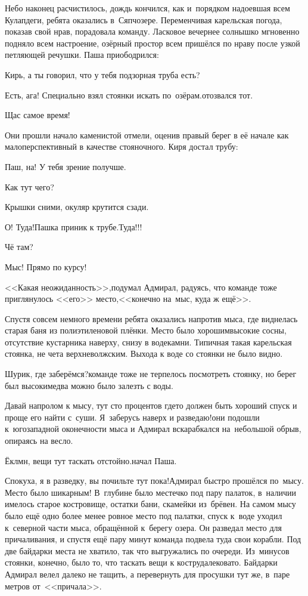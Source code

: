 Небо наконец расчистилось, дождь кончился, как и~порядком надоевшая всем Кулапдеги, ребята оказались в~Сяпчозере. Переменчивая карельская погода, показав свой нрав, порадовала команду. Ласковое вечернее солнышко мгновенно подняло всем настроение, озёрный простор всем пришёлся по нраву после узкой петляющей речушки. Паша приободрился:

\diagdash Кирь, а ты говорил, что у тебя подзорная труба есть?

\diagdash Есть, ага! Специально взял стоянки искать по~озёрам.\mdash отозвался тот.  

\diagdash Щас самое время!

Они прошли начало каменистой отмели, оценив правый берег в её начале как малоперспективный в качестве стояночного. Киря достал трубу:

\diagdash Паш, на! У тебя зрение получше.

\diagdash Как тут чего?

\diagdash Крышки сними, окуляр крутится сзади.

\diagdash О! Туда!\mdash Пашка приник к трубе.\mdash Туда!!!

\diagdash Чё там?

\diagdash Мыс! Прямо по курсу!

<<Какая неожиданность>>,\mdash подумал Адмирал, радуясь, что команде тоже приглянулось <<его>> место,\mdash <<конечно на~мыс, куда ж ещё>>.

Спустя совсем немного времени ребята оказались напротив мыса, где виднелась старая баня из полиэтиленовой плёнки. Место было хорошим\mdash высокие сосны, отсутствие кустарника наверху, снизу в воде\mdash камни. Типичная такая карельская стоянка, не чета верхневолжским. Выхода к воде со стоянки не было видно. 

\diagdash Шурик, где заберёмся?\mdash команде тоже не терпелось посмотреть стоянку, но берег был высоким\mdash едва можно было залезть с воды.

\diagdash Давай напролом к мысу, тут сто процентов где\sdash то должен быть хороший спуск и проще его найти с~суши. Я~заберусь наверх и разведаю!\mdash они подошли к~юго\sdash западной оконечности мыса и Адмирал вскарабкался на~небольшой обрыв, опираясь на весло.

\diagdash Ёклмн, вещи тут таскать отстойно.\mdash начал Паша. 

\diagdash Спокуха, я в разведку, вы почильте тут пока!\mdash Адмирал быстро прошёлся по~мысу. Место было шикарным! В~глубине было местечко под пару палаток, в~наличии имелось старое костровище, остатки бани, скамейки из~брёвен. На самом мысу было ещё одно более менее ровное место под палатки, спуск к~воде уходил к~северной части мыса, обращённой к~берегу озера. Он разведал место для причаливания, и спустя ещё пару минут команда подвела туда свои корабли. Под две байдарки места не хватило, так что выгружались по очереди. Из~минусов стоянки, конечно, было то, что таскать вещи к костру\mdash далековато. Байдарки Адмирал велел далеко не тащить, а перевернуть для просушки тут же, в~паре метров от~<<причала>>.

